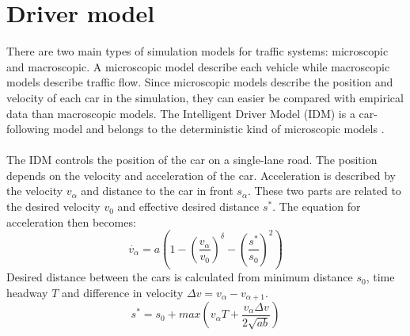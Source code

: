 \section{Driver model}
There are two main types of simulation models for traffic systems: microscopic
and macroscopic. A microscopic model describe each vehicle while macroscopic
models describe traffic flow. Since microscopic models describe the position
and velocity of each car in the simulation, they can easier be compared with
empirical data than macroscopic models. The Intelligent Driver Model (IDM)
is a car-following model and belongs to the deterministic kind of microscopic
models \cite{idm}.\\\\
The IDM controls the position of the car on a single-lane road. The position depends on the velocity and acceleration of the car. Acceleration is described by the velocity \begin{math}v_\alpha\end{math} and distance to the car in front \begin{math}s_\alpha\end{math}. These two parts are related to the desired velocity \begin{math}v_0\end{math} and effective desired distance \begin{math}s^\ast\end{math}. The equation for acceleration then becomes:
\begin{equation}\label{driver_acc}\dot{v_\alpha} = a\left
(1-(\frac{v_\alpha}{v_0})^\delta-(\frac{s^\ast}{s_0})^2 \right)\end{equation}
Desired distance between the cars is calculated from minimum distance \begin{math}s_0\end{math}, time headway \begin{math}T\end{math} and difference in velocity \begin{math}\Delta v = v_\alpha - v_{\alpha + 1}\end{math}.
\begin{equation}\label{desireddist}s^\ast = s_0 + max \left (v_\alpha T +
\frac{v_\alpha \Delta v}{2\sqrt{ab}}\right )\end{equation}
